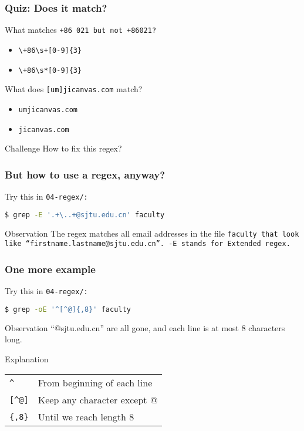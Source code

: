 \begin{frame}[fragile]
\frametitle{Quiz: Does it match?}
What matches \tt{+86 021} but not \tt{+86021}?
\begin{itemize}
    \item \verb|\+86\s+[0-9]{3}| %
    \item \verb|\+86\s*[0-9]{3}|
\end{itemize}

What does \Large \verb|[um]jicanvas.com| \normalsize match?
\begin{itemize}
    \item \tt{umjicanvas.com}
    \item \tt{jicanvas.com} %
\end{itemize}

\begin{block}{Challenge}
    How to fix this regex? %
\end{block}
\end{frame}

\begin{frame}[fragile]
\frametitle{But how to use a regex, anyway?}
Try this in \tt{04-regex/}:
\begin{lstlisting}[language=bash]
$ grep -E '.+\..+@sjtu.edu.cn' faculty
\end{lstlisting}
\pause
\begin{block}{Observation}
    The regex matches all email addresses in the file \tt{faculty}
    that look like ``firstname.lastname@sjtu.edu.cn''.
    \newline \newline
    \tt{-E} stands for Extended regex.
\end{block}
\end{frame}

\begin{frame}[fragile]
\frametitle{One more example}
Try this in \tt{04-regex/}:
\begin{lstlisting}[language=bash]
$ grep -oE '^[^@]{,8}' faculty
\end{lstlisting}
\pause
\begin{block}{Observation}
    ``@sjtu.edu.cn'' are all gone, and each line is at most 8 characters long.
\end{block}
\begin{block}{Explanation}
    \begin{tabular}{ll}
        \verb|^|    & From beginning of each line \\
        \verb|[^@]| & Keep any character except @ \\
        \verb|{,8}| & Until we reach length 8
    \end{tabular}
\end{block}
\end{frame}


